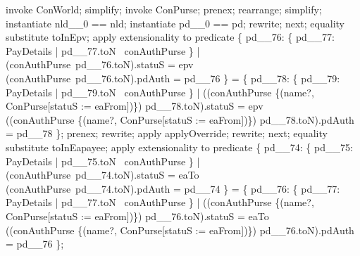 \begin{LPScript}
\begin{zproof}[lPromotedAuxWorldAbortType]
            invoke ConWorld;
            simplify;
            invoke ConPurse;
            prenex;
            rearrange;
            simplify;
            instantiate nld\_\_0 == nld;
            instantiate pd\_\_0 == pd;
            rewrite;
        next;
            equality substitute toInEpv;
            apply extensionality to predicate
            \{ pd\_\_76: \{ pd\_\_77: PayDetails | pd\_\_77.toN \in \dom~conAuthPurse \}
                |       (conAuthPurse~pd\_\_76.toN).statuS = epv \\
                    \land (conAuthPurse~pd\_\_76.toN).pdAuth = pd\_\_76 \}
            = \{ pd\_\_78: \{ pd\_\_79: PayDetails | pd\_\_79.toN \in \dom~conAuthPurse \}
                    |       ((conAuthPurse
                            \oplus \{(name?, \theta ConPurse[statuS := eaFrom])\})
                            pd\_\_78.toN).statuS
                            = epv \\
                    \land ((conAuthPurse
                            \oplus \{(name?, \theta ConPurse[statuS := eaFrom])\})
                            pd\_\_78.toN).pdAuth
                            = pd\_\_78 \};
            prenex;
            rewrite;
            apply applyOverride;
            rewrite;
        next;
            equality substitute toInEapayee;
            apply extensionality to predicate
            \{ pd\_\_74: \{ pd\_\_75: PayDetails | pd\_\_75.toN \in \dom~conAuthPurse \}
                |       (conAuthPurse~pd\_\_74.toN).statuS = eaTo \\
                    \land (conAuthPurse~pd\_\_74.toN).pdAuth = pd\_\_74 \}
            = \{ pd\_\_76: \{ pd\_\_77: PayDetails | pd\_\_77.toN \in \dom~conAuthPurse \}
                    |       ((conAuthPurse
                            \oplus \{(name?, \theta ConPurse[statuS := eaFrom])\})
                            pd\_\_76.toN).statuS
                            = eaTo \\
                    \land ((conAuthPurse
                            \oplus \{(name?, \theta ConPurse[statuS := eaFrom])\})
                            pd\_\_76.toN).pdAuth
                            = pd\_\_76 \};


\end{zproof}
\end{LPScript}
